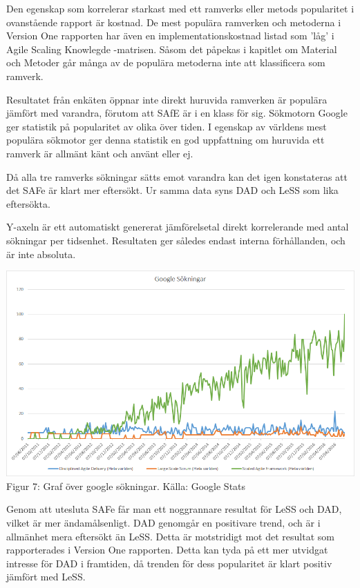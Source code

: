 	
		Den egenskap som korrelerar starkast med ett ramverks eller metods popularitet i ovanstående rapport är kostnad. De mest populära ramverken och metoderna i Version One rapporten har även en implementationskostnad listad som 'låg' i Agile Scaling Knowlegde -matrisen. \cite{ask_matrix}				
		Såsom det påpekas i kapitlet om Material och Metoder går många av de populära metoderna inte att klassificera som ramverk. 
		
		
		Resultatet från enkäten öppnar inte direkt huruvida ramverken är populära jämfört med varandra, förutom att SAfE är i en klass för sig. Sökmotorn Google ger statistik på popularitet av olika över tiden. I egenskap av världens mest populära sökmotor ger denna statistik en god uppfattning om huruvida ett ramverk är allmänt känt och använt eller ej. 
		
		Då alla tre ramverks sökningar sätts emot varandra kan det igen konstateras att det SAFe är klart mer eftersökt. Ur samma data syns DAD och LeSS som lika eftersökta.
		
		Y-axeln är ett automatiskt genererat jämförelsetal direkt korrelerande med antal sökningar per tidsenhet. Resultaten ger således endast interna förhållanden, och är inte absoluta.
		\begin{center}
			\includegraphics{Grafer/Google_sokningar.png}
			\\ Figur 7: Graf över google sökningar. Källa: Google Stats \cite{google_stats}
		\end{center}
	
	
		Genom att utesluta SAFe får man ett noggrannare resultat för LeSS och DAD, vilket är mer ändamålsenligt. DAD genomgår en positivare trend, och är i allmänhet mera eftersökt än LeSS. Detta är motstridigt mot det resultat som rapporterades i Version One rapporten. Detta kan tyda på ett mer utvidgat intresse för DAD i framtiden, då trenden för dess popularitet är klart positiv jämfört med LeSS.
	
